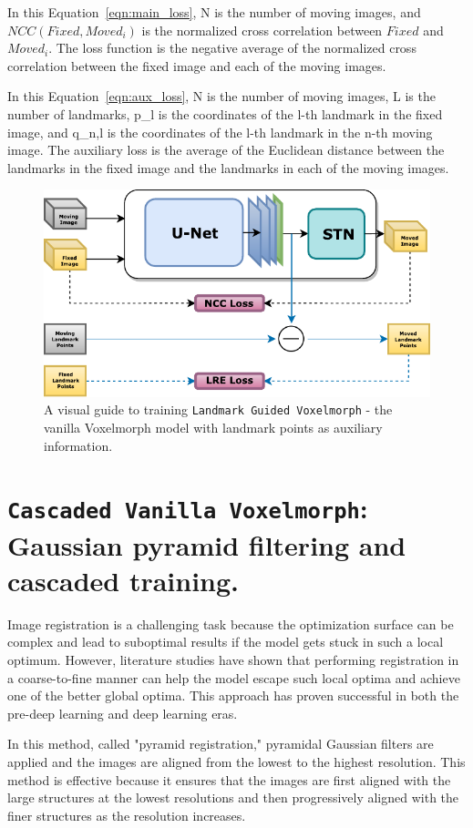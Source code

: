 \documentclass{book}
\begin{document}
	In this Equation~\ref{eqn:main_loss}, N is the number of moving images, and $NCC(Fixed, Moved_i)$ is the normalized cross correlation between $Fixed$ and $Moved_i$. The loss function is the negative average of the normalized cross correlation between the fixed image and each of the moving images.
	
	In this Equation~\ref{eqn:aux_loss}, N is the number of moving images, L is the number of landmarks, p\_l is the coordinates of the l-th landmark in the fixed image, and q\_{n,l} is the coordinates of the l-th landmark in the n-th moving image. The auxiliary loss is the average of the Euclidean distance between the landmarks in the fixed image and the landmarks in each of the moving images.
	
	\begin{figure}[h!]
		\centering
		\includegraphics[width=0.6\columnwidth]{resources/chapter4/methods/Method2.pdf}
		\caption{A visual guide to training \texttt{Landmark Guided Voxelmorph} - the vanilla Voxelmorph model with landmark points as auxiliary information.}
		\label{fig:block_method2}
	\end{figure}

	\section{\texttt{Cascaded Vanilla Voxelmorph}: Gaussian pyramid filtering and cascaded training.}
	Image registration is a challenging task because the optimization surface can be complex and lead to suboptimal results if the model gets stuck in such a local optimum. However, literature studies have shown that performing registration in a coarse-to-fine manner can help the model escape such local optima and achieve one of the better global optima. This approach has proven successful in both the pre-deep learning and deep learning eras.
	
	In this method, called "pyramid registration," pyramidal Gaussian filters are applied and the images are aligned from the lowest to the highest resolution. This method is effective because it ensures that the images are first aligned with the large structures at the lowest resolutions and then progressively aligned with the finer structures as the resolution increases.
	
\end{document}
